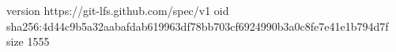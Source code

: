 version https://git-lfs.github.com/spec/v1
oid sha256:4d44c9b5a32aabafdab619963df78bb703cf6924990b3a0c8fe7e41e1b794d7f
size 1555
